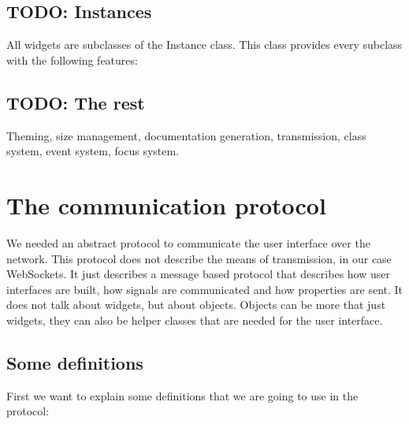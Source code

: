 \documentclass[11pt]{article}
\begin{document}
\subsection{TODO: Instances}

All widgets are subclasses of the Instance class.
This class provides every subclass with the following features:


\subsection{TODO: The rest}

Theming, size management, documentation generation, transmission, class system, event system, focus system.







\newpage
\section{The communication protocol}

We needed an abstract protocol to communicate the user interface over the network.
This protocol does not describe the means of transmission, in our case WebSockets.
It just describes a message based protocol that describes how user interfaces are built, how signals are communicated and how properties are sent.
It does not talk about widgets, but about objects. Objects can be more that just widgets, they can also be helper classes that are needed for the user interface.

\subsection{Some definitions}

First we want to explain some definitions that we are going to use in the protocol:
\end{document}

